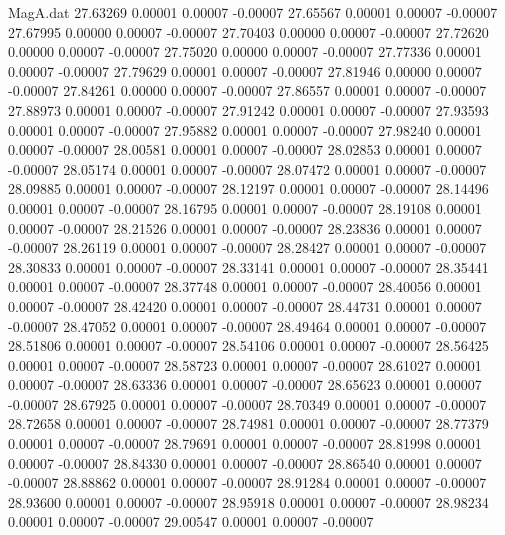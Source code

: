 \begin{filecontents}{MagA.dat}
  27.63269    0.00001    0.00007   -0.00007
  27.65567    0.00001    0.00007   -0.00007
  27.67995    0.00000    0.00007   -0.00007
  27.70403    0.00000    0.00007   -0.00007
  27.72620    0.00000    0.00007   -0.00007
  27.75020    0.00000    0.00007   -0.00007
  27.77336    0.00001    0.00007   -0.00007
  27.79629    0.00001    0.00007   -0.00007
  27.81946    0.00000    0.00007   -0.00007
  27.84261    0.00000    0.00007   -0.00007
  27.86557    0.00001    0.00007   -0.00007
  27.88973    0.00001    0.00007   -0.00007
  27.91242    0.00001    0.00007   -0.00007
  27.93593    0.00001    0.00007   -0.00007
  27.95882    0.00001    0.00007   -0.00007
  27.98240    0.00001    0.00007   -0.00007
  28.00581    0.00001    0.00007   -0.00007
  28.02853    0.00001    0.00007   -0.00007
  28.05174    0.00001    0.00007   -0.00007
  28.07472    0.00001    0.00007   -0.00007
  28.09885    0.00001    0.00007   -0.00007
  28.12197    0.00001    0.00007   -0.00007
  28.14496    0.00001    0.00007   -0.00007
  28.16795    0.00001    0.00007   -0.00007
  28.19108    0.00001    0.00007   -0.00007
  28.21526    0.00001    0.00007   -0.00007
  28.23836    0.00001    0.00007   -0.00007
  28.26119    0.00001    0.00007   -0.00007
  28.28427    0.00001    0.00007   -0.00007
  28.30833    0.00001    0.00007   -0.00007
  28.33141    0.00001    0.00007   -0.00007
  28.35441    0.00001    0.00007   -0.00007
  28.37748    0.00001    0.00007   -0.00007
  28.40056    0.00001    0.00007   -0.00007
  28.42420    0.00001    0.00007   -0.00007
  28.44731    0.00001    0.00007   -0.00007
  28.47052    0.00001    0.00007   -0.00007
  28.49464    0.00001    0.00007   -0.00007
  28.51806    0.00001    0.00007   -0.00007
  28.54106    0.00001    0.00007   -0.00007
  28.56425    0.00001    0.00007   -0.00007
  28.58723    0.00001    0.00007   -0.00007
  28.61027    0.00001    0.00007   -0.00007
  28.63336    0.00001    0.00007   -0.00007
  28.65623    0.00001    0.00007   -0.00007
  28.67925    0.00001    0.00007   -0.00007
  28.70349    0.00001    0.00007   -0.00007
  28.72658    0.00001    0.00007   -0.00007
  28.74981    0.00001    0.00007   -0.00007
  28.77379    0.00001    0.00007   -0.00007
  28.79691    0.00001    0.00007   -0.00007
  28.81998    0.00001    0.00007   -0.00007
  28.84330    0.00001    0.00007   -0.00007
  28.86540    0.00001    0.00007   -0.00007
  28.88862    0.00001    0.00007   -0.00007
  28.91284    0.00001    0.00007   -0.00007
  28.93600    0.00001    0.00007   -0.00007
  28.95918    0.00001    0.00007   -0.00007
  28.98234    0.00001    0.00007   -0.00007
  29.00547    0.00001    0.00007   -0.00007

\end{filecontents}
